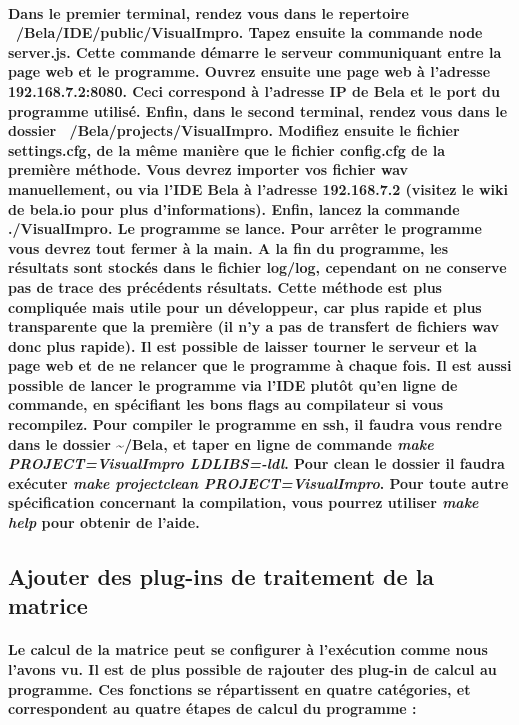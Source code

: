 \documentclass[a4paper]{article}
\begin{document}
\paragraph{Dans le premier terminal, rendez vous dans le repertoire
~/Bela/IDE/public/VisualImpro. Tapez ensuite la commande node server.js. Cette
commande démarre le serveur communiquant entre la page web et le programme.
Ouvrez ensuite une page web à l’adresse 192.168.7.2:8080. Ceci correspond à
l’adresse IP de Bela et le port du programme utilisé. Enfin, dans le second
terminal, rendez vous dans le dossier ~/Bela/projects/VisualImpro. Modifiez
ensuite le fichier settings.cfg, de la même manière que le fichier config.cfg de
la première méthode. Vous devrez importer vos fichier wav manuellement, ou via
l’IDE Bela à l’adresse 192.168.7.2 (visitez le wiki de bela.io pour plus
d’informations). Enfin, lancez la commande ./VisualImpro. Le programme se lance.
Pour arrêter le programme vous devrez tout fermer à la main. A la fin du
programme, les résultats sont stockés dans le fichier log/log, cependant on ne
conserve pas de trace des précédents résultats. Cette méthode est plus
compliquée mais utile pour un développeur, car plus rapide et plus transparente
que la première (il n’y a pas de transfert de fichiers wav donc plus rapide). Il
est possible de laisser tourner le serveur et la page web et de ne relancer que
le programme à chaque fois. Il est aussi possible de lancer le programme via
l’IDE plutôt qu’en ligne de commande, en spécifiant les bons flags au
compilateur si vous recompilez. Pour compiler le programme en ssh, il faudra
vous rendre dans le dossier \textasciitilde/Bela, et taper en ligne de commande
\textit{make PROJECT=VisualImpro LDLIBS=-ldl}. Pour clean le dossier il faudra
exécuter \textit{make projectclean PROJECT=VisualImpro}. Pour toute autre
spécification concernant la compilation, vous pourrez utiliser \textit{make
help} pour obtenir de l'aide.}

\subsection{Ajouter des plug-ins de traitement de la matrice} \paragraph{Le
calcul de la matrice peut se configurer à l’exécution comme nous l’avons vu. Il
est de plus possible de rajouter des plug-in de calcul au programme. Ces
fonctions se répartissent en quatre catégories, et correspondent au quatre
étapes de calcul du programme :}
\end{document}
